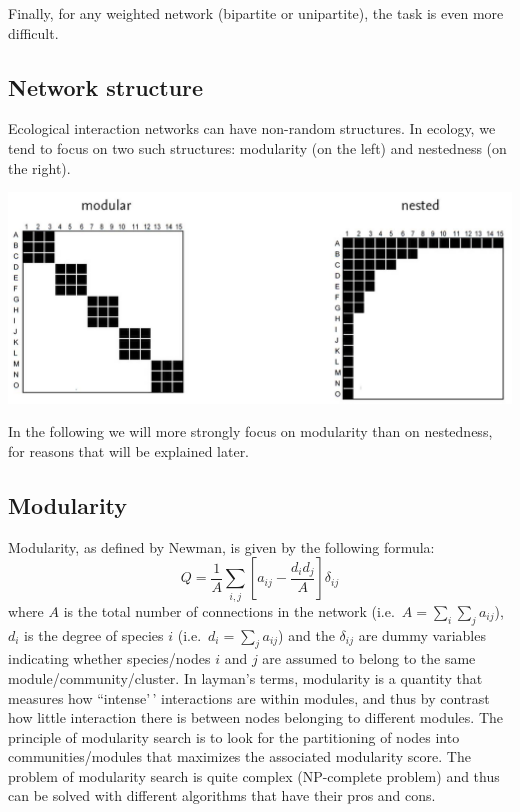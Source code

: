 \documentclass[
]{book}
\theoremstyle{definition}
\theoremstyle{definition}
\theoremstyle{definition}
\theoremstyle{definition}
\theoremstyle{remark}
\begin{document}
Finally, for any weighted network (bipartite or unipartite), the task is even more difficult.

\subsection{Network structure}\label{network-structure}

Ecological interaction networks can have non-random structures. In ecology, we tend to focus on two such structures: modularity (on the left) and nestedness (on the right).

\includegraphics[width=18.38in]{fig06Networks/Lewinsohn}

In the following we will more strongly focus on modularity than on nestedness, for reasons that will be explained later.

\subsection{Modularity}\label{modularity}

Modularity, as defined by Newman, is given by the following formula:
\[\begin{equation}
Q = \frac{1}{A} \sum_{i,j} \left[ a_{ij} - \frac{d_i d_j}{A}\right]\delta_{ij}
\end{equation}\]
where \(A\) is the total number of connections in the network (i.e.~\(A = \sum_i \sum_j a_{ij}\)), \(d_i\) is the degree of species \(i\) (i.e.~\(d_i = \sum_j a_{ij}\)) and the \(\delta_{ij}\) are dummy variables indicating whether species/nodes \(i\) and \(j\) are assumed to belong to the same module/community/cluster.
In layman's terms, modularity is a quantity that measures how ``intense'\,' interactions are within modules, and thus by contrast how little interaction there is between nodes belonging to different modules.
The principle of modularity search is to look for the partitioning of nodes into communities/modules that maximizes the associated modularity score.
The problem of modularity search is quite complex (NP-complete problem) and thus can be solved with different algorithms that have their pros and cons.
\end{document}
